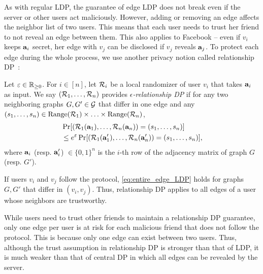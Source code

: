 As with regular LDP, the guarantee of edge LDP does not break 
even if 
the server or other users act maliciously. 
However, 
adding or removing an edge
affects the neighbor list of two users. 
This means that each user needs to trust 
her friend 
to not reveal 
an edge between them. 
This also applies to Facebook -- even if $v_i$ keeps $\mathbf{a}_i$ secret, her edge with $v_j$ can be disclosed if $v_j$ reveals $\mathbf{a}_j$. 
To protect each edge during the whole process, 
we use 
another 
privacy notion 
called relationship DP~\cite{Imola_USENIX21}:

\begin{definition}  
\label{def:entire_edge_LDP} 
  Let $\varepsilon \in \mathbb{R}_{\ge0}$. For 
  $i \in [n]$, 
  let $\mathcal{R}_i$ be a 
  local randomizer of user $v_i$ that 
  takes $\mathbf{a}_i$ as input. We say 
  $(\mathcal{R}_1, \ldots, \mathcal{R}_n)$ provides 
\emph{$\epsilon$-relationship DP} 
if for any two neighboring graphs $G, G' \in \mathcal{G}$ that differ in one edge and 
  any $(s_1, \ldots, s_n) \in \mathrm{Range}(\mathcal{R}_1) \times \ldots \times \mathrm{Range}(\mathcal{R}_n)$, 
\begin{align}
  &\Pr[(\mathcal{R}_1(\mathbf{a}_1), \ldots, \mathcal{R}_n(\mathbf{a}_n)) = (s_1, \ldots, s_n)] \nonumber\\
  &\leq e^\varepsilon \Pr[(\mathcal{R}_1(\mathbf{a}'_1), \ldots, \mathcal{R}_n(\mathbf{a}'_n)) = (s_1,
  \ldots, s_n)],
\label{eq:entire_edge_LDP}
\end{align}
  where $\mathbf{a}_i$ (resp. $\mathbf{a}_i'$) $\in \{0,1\}^n$ is the $i$-th row of the
  adjacency matrix of graph $G$ (resp. $G'$).
\end{definition}
If 
users $v_i$ and $v_j$ follow the protocol, 
\eqref{eq:entire_edge_LDP} holds for graphs $G,G'$ that differ 
in $(v_i, v_j)$. 
Thus, 
relationship DP applies to
all edges of a user 
whose 
neighbors are 
trustworthy.

While users need to trust other 
friends 
to maintain a relationship
DP guarantee, only one edge per user is at risk for each malicious 
friend 
that
does not follow the protocol. This is
because only one edge can exist between two users.  
Thus, although the trust assumption in relationship DP is stronger than that of LDP, it is much weaker than that of central DP in which all edges can be revealed by the server. 


